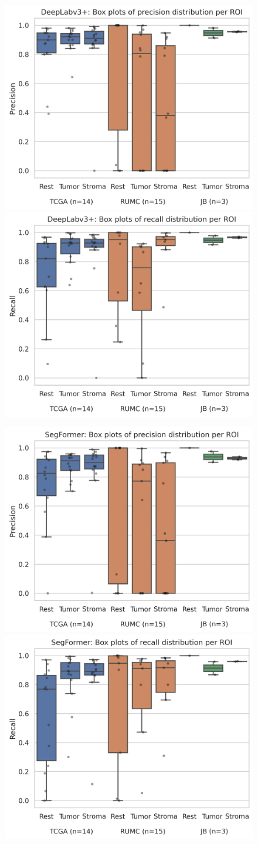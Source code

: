 \begin{figure}
\includegraphics[width=.5\linewidth]{figures/tissue/deeplabv3+_prec_roi_wsirois.png}
\includegraphics[width=.5\linewidth]{figures/tissue/deeplabv3+_recall_roi_wsirois.png}

\includegraphics[width=.5\linewidth]{figures/tissue/segformer_prec_roi_wsirois.png}
\includegraphics[width=.5\linewidth]{figures/tissue/segformer_recall_roi_wsirois.png}


\end{figure}
